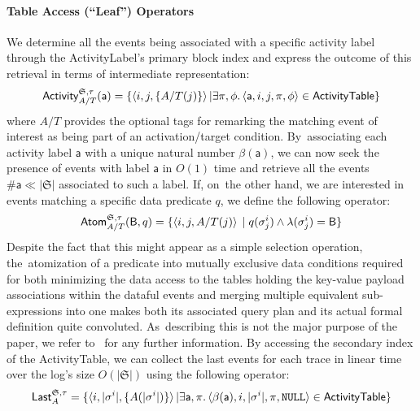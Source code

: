 \documentclass[information,article,accept,pdftex,oneauthor]{Definitions/mdpi}
\newcommand{\const}[1]{\ensuremath{\mathsf{#1}}}
\newcommand{\LOG}{\ensuremath{\mathfrak{S}}}
\begin{document}
\paragraph{Table Access (``Leaf'') Operators} We  determine all the events being associated with a specific activity label through the ActivityLabel's primary block index and express the outcome of this retrieval in terms of intermediate representation:
\[ \textsf{Activity}^{\LOG,\tau}_{A/T}(\const{a})=\{\braket{i,j,\{A/T(j)\}}|\exists \pi,\phi.\braket{\const{a},i,j,\pi,\phi}\in\textsf{ActivityTable}\}\]
where $A/T$ provides the optional tags for remarking the matching event of interest as being part of an activation/target condition. By~associating each activity label \const{a} with a unique natural number $\beta(\const{a})$, we can now seek the presence of events with label \const{a} in $O(1)$ time and retrieve all the events $\#{\textsf{a}}\ll |\LOG|$ associated to such a label. If, on~the other hand, we are interested in events matching a specific data predicate $q$,  we define the following operator:
\[\textsf{Atom}^{\LOG,\tau}_{A/T}(\textsf{B},q)=\{\braket{i,j,{A/T(j)}}\;|\;q(\sigma^i_j)\wedge \lambda(\sigma^i_j)=\textsf{B}\}\]
Despite the fact that this might appear as a simple selection operation, the~atomization of a predicate into mutually exclusive data conditions required for both minimizing the data access to the tables holding the key-value payload associations within the dataful events and merging multiple equivalent sub-expressions into one makes both its associated query plan and its actual formal definition quite convoluted. As~describing this is not the major purpose of the paper, we refer to~\cite{info14030173}
 for any further information. %
By accessing the secondary index of the \textsf{ActivityTable}, we can collect the last events for each trace in linear time over the log's size $O(|\LOG|)$ using the following operator:
\[\textsf{Last}^{\LOG,\tau}_{A}=\{\braket{i,\vert\sigma^i\vert,\{A(\vert\sigma^i\vert)\}}|\exists \const{a}, \pi.\braket{\beta(\const{a}),i,|\sigma^i|,\pi,\texttt{NULL}}\in\textsf{ActivityTable}\}\]
\end{document}
